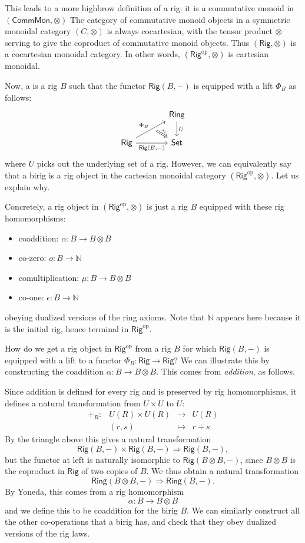 \documentclass[12pt,reqno]{amsart}
\theoremstyle{plain}
\theoremstyle{definition}
\theoremstyle{remark}
\newcommand{\define}[1]{{\bf \boldmath{#1}}\index{#1}}
\newcommand{\maps}{\colon}
\newcommand{\To}{\Rightarrow}
\newcommand{\op}{^\mathrm{op}}
\newcommand{\N}{\mathbb N}
\newcommand{\namedcat}[1]{\mathsf{#1}}
\newcommand{\Comm}{\namedcat{Comm}}
\newcommand{\Mon}{\namedcat{Mon}}
\newcommand{\Rig}{\namedcat{Rig}}
\newcommand{\Ring}{\namedcat{Ring}}
\newcommand{\Set}{\namedcat{Set}}
\numberwithin{thm}{section}
\begin{document}
This leads to a more highbrow definition of a rig: it is a commutative monoid in $(\Comm\Mon, \otimes)$   The category of commutative monoid objects in a symmetric monoidal category $(C, \otimes)$ is always cocartesian, with the tensor product $\otimes$ serving to give the coproduct of commutative monoid objects. Thus $(\Rig, \otimes)$ is a cocartesian monoidal category. In other words, $(\Rig\op, \otimes)$ is cartesian monoidal.

Now, a \define{birig} is a rig $B$ such that the functor $\Rig(B, -)$ is equipped with a lift $\Phi_B$ as follows: 
\[
\begin{tikzcd}[column sep = large]
    &
    \Ring
    \arrow[d, "U"]
    \\
    \Rig
    \arrow[ur, "\Phi_B"]
    \arrow[ur, swap, ""{name = phi}, phantom, bend right = 5, pos = 0.6]
    \arrow[r, swap, "{\Rig(B, -)}"]
    \arrow[from = phi, r, Rightarrow, "\sim", sloped]
    &
    \Set
\end{tikzcd}
\] 
where $U$ picks out the underlying set of a rig. However, we can equivalently say that a birig is a rig object in the cartesian monoidal category $(\Rig\op, \otimes)$. Let us explain why. 

Concretely, a rig object in $(\Rig\op, \otimes)$ is just a rig $B$ equipped with these rig homomorphisms:
\begin{itemize}
    \item coaddition: $\alpha \maps B \to B \otimes B$
    \item co-zero: $o \maps B \to \N$
    \item comultiplication: $\mu \maps B \to B \otimes B$
    \item co-one: $\epsilon \maps B \to \N$
\end{itemize}
obeying dualized versions of the ring axioms. Note that $\N$ appears here because it is the initial rig, hence terminal in $\Rig\op$.

How do we get a rig object in $\Rig\op$ from a rig $B$ for which $\Rig(B, -)$ is equipped with a lift to a functor $\Phi_B \maps \Rig \to \Rig$? We can illustrate this by constructing the coaddition $\alpha \maps B \to B \otimes B$. This comes from \emph{addition}, as follows.

Since addition is defined for every rig and is preserved by rig homomorphisms, it defines a natural transformation from $U \times U$ to $U$:
\[   
\begin{array}{cccl}
   +_R \maps & U(R) \times U(R) &\to& U(R)\\
             & (r, s) & \mapsto & r + s.
\end{array}
\]
By the triangle above this gives a natural transformation 
\[  
    \Rig(B, -) \times \Rig(B, -) \To \Rig(B, -) , 
\]
but the functor at left is naturally isomorphic to $\Rig(B \otimes B, -)$, since $B \otimes B$ is the coproduct in $\Rig$ of two copies of $B$. We thus obtain a natural transformation
\[  
    \Ring(B \otimes B, -) \To \Ring(B, - ) .
\]
By Yoneda, this comes from a rig homomorphism
\[    
    \alpha \maps B \to B \otimes B 
\]
and we define this to be coaddition for the birig $B$. We can similarly construct all the other co-operations that a birig has, and check that they obey dualized versions of the rig laws.
\end{document}
